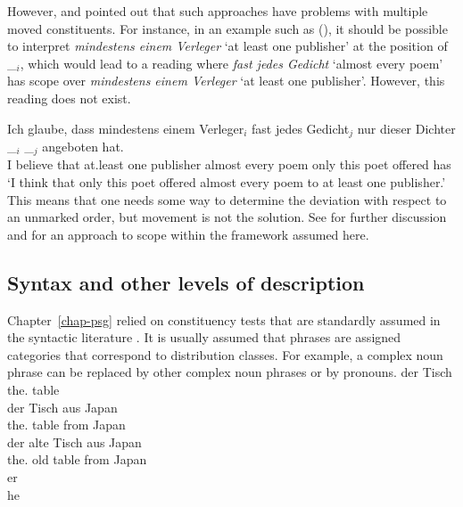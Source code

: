 \noindent
However, \citet[]{Kiss2001a} and \citet[Section~2.6]{Fanselow2001a} pointed out that such
approaches have problems with multiple moved constituents. For instance, in an example such as
(), it should be possible to interpret \emph{mindestens einem Verleger} `at least one
publisher' at the position of \_$_i$, which would lead to a reading where \emph{fast jedes Gedicht}
`almost every poem' has scope over \emph{mindestens einem Verleger} `at least one
publisher'. However, this reading does not exist.%
\largerpage


\ea
\gll Ich glaube, dass mindestens einem Verleger$_i$ fast jedes Gedicht$_j$ nur dieser Dichter \_$_i$ \_$_j$ angeboten hat.\\
     I believe that at.least one publisher almost every poem only this poet {} {} offered has\\
\glt `I think that only this poet offered almost every poem to at least one publisher.'
\z
\noindent
This means that one needs some way to determine the deviation with respect to an unmarked order, but
movement is not the solution. See  for further discussion and
\citet{Kiss2001a} for an approach to scope within the framework assumed here.%

\subsection{Syntax and other levels of description}
\label{sec-down-to-earth-syntax}

Chapter~\ref{chap-psg} relied on constituency tests that are standardly assumed in the syntactic
literature \parencites[24--31]{Borsley91a}[35--36]{Haegeman94a-u}[20--23]{HP2002a-ed}[29--33]{SWB2003a}[19--22]{KS2008a-u}[Chapter~1.3]{MuellerGT-Eng}{MyP2022a}.
It is usually assumed that phrases are assigned categories that correspond to distribution
classes. For example, a complex noun phrase can be replaced by other complex noun phrases or by
pronouns. 
\eal
\label{ex-np-tisch}
\ex 
\gll der Tisch\\
     the.\NOM{} table\\
\ex 
\gll der Tisch aus Japan\\
     the.\NOM{} table from Japan\\
\ex 
\gll der alte Tisch aus Japan\\
     the.\NOM{} old  table from Japan\\
\ex 
\gll er\\
     he\\
\zl

